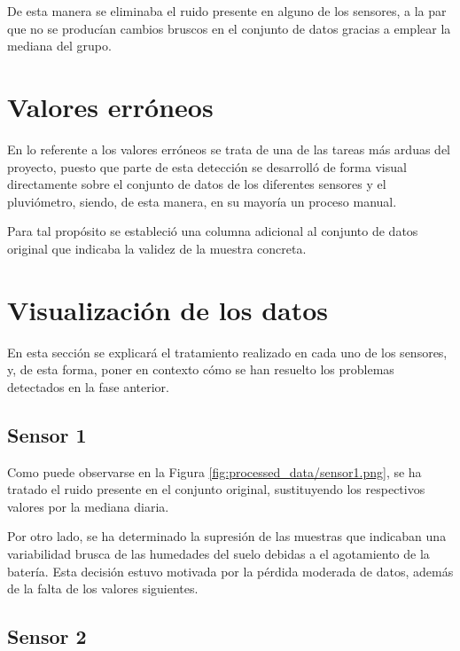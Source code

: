 
De esta manera se eliminaba el ruido presente en alguno de los sensores, a la par 
que no se producían cambios bruscos en el conjunto de datos gracias a emplear la 
mediana del grupo.

\section{Valores erróneos}
En lo referente a los valores erróneos se trata de una de las tareas más arduas 
del proyecto, puesto que parte de esta detección se desarrolló de forma visual directamente
sobre el conjunto de datos de los diferentes sensores y el pluviómetro, siendo, 
de esta manera, en su mayoría un proceso manual.

Para tal propósito se estableció una columna adicional al conjunto de datos original
que indicaba la validez de la muestra concreta.

\section{Visualización de los datos}
En esta sección se explicará el tratamiento realizado en cada uno de los sensores, y,
de esta forma, poner en contexto cómo se han resuelto los problemas detectados
en la fase anterior.

\subsection{Sensor 1}

Como puede observarse en la Figura \ref{fig:processed_data/sensor1.png}, 
se ha tratado el ruido presente en el conjunto original, sustituyendo los 
respectivos valores por la mediana diaria.

Por otro lado, se ha determinado la supresión de las muestras que indicaban una 
variabilidad brusca de las humedades del suelo debidas a el agotamiento de la batería.
Esta decisión estuvo motivada por la pérdida moderada de datos, además de la 
falta de los valores siguientes.

\newpage

\subsection{Sensor 2}

